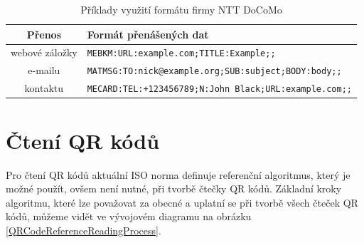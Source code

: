 \begin{table}[H]
  \begin{center} 
    \begin{tabular}{| c | l |} \hline
    \textbf{Přenos} & \textbf{Formát přenášených dat} \\ \hline
    webové záložky & \texttt{MEBKM:URL:example.com;TITLE:Example;;} \\ \hline
    e-mailu & \texttt{MATMSG:TO:nick@example.org;SUB:subject;BODY:body;;}\\
    \hline kontaktu & \texttt{MECARD:TEL:+123456789;N:John
    Black;URL:example.com;;} \\ \hline
    \end{tabular}
    \caption{Příklady využití formátu firmy NTT DoCoMo}
    \label{DOCOMOFormatsTable}
  \end{center}
\end{table}

\section{Čtení QR kódů}
\label{refCteniQRKodu}

Pro čtení QR kódů aktuální ISO norma definuje referenční algoritmus, který je
možné použít, ovšem není nutné, při tvorbě čtečky QR kódů. Základní kroky 
algoritmu, které lze považovat za obecné a uplatní se při tvorbě všech čteček 
QR kódů, můžeme vidět ve vývojovém diagramu na obrázku
\ref{QRCodeReferenceReadingProcess}.

